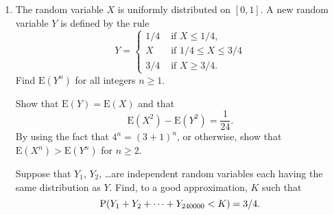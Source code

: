 \documentclass[a4, 11pt]{report}
\newlength{\qspace}
\newcounter{qnumber}
\newenvironment{question}%
 {\vspace{\qspace}
  \begin{enumerate}[\bfseries 1\quad][10]%
    \setcounter{enumi}{\value{qnumber}}%
    \item%
 }
{
  \end{enumerate}
  \filbreak
  \stepcounter{qnumber}
 }
\begin{document}
\begin{question}
The random variable $X$ is
uniformly distributed on $[0,1]$. A new random variable
$Y$ is defined by the rule 
\[
Y=\begin{cases}
1/4 & \mbox{ if }X\leqslant1/4,\\
X & \mbox{ if }1/4\leqslant X\leqslant3/4\\
3/4 & \mbox{ if }X\geqslant3/4.
\end{cases}
\]
Find ${\mathrm E}(Y^{n})$ for all integers $n\geqslant 1$.

Show that ${\mathrm E}(Y)={\mathrm E}(X)$ and that
\[{\mathrm E}(X^{2})-{\mathrm E}(Y^{2})=\frac{1}{24}.\]
By using the fact that $4^{n}=(3+1)^{n}$, or otherwise,
show that ${\mathrm E}(X^{n})>{\mathrm E}(Y^{n})$ for $n\geqslant 2$.

Suppose that $Y_{1}$, $Y_{2}$, \dots are independent random variables
each having the same distribution as $Y$.
Find, to a good approximation, $K$ such that
\[{\rm P}(Y_{1}+Y_{2}+\cdots+Y_{240000}<K)=3/4.\]

\end{question}
	
\end{document}
